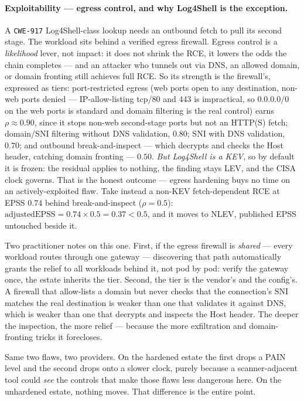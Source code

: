\documentclass[11pt]{article}
\newcommand{\code}[1]{\texttt{#1}}
\begin{document}
\paragraph{Exploitability --- egress control, and why Log4Shell is the exception.}
A \code{CWE-917} Log4Shell-class lookup needs an outbound fetch to pull its second
stage. The workload sits behind a verified egress firewall. Egress control is a
\emph{likelihood} lever, not impact: it does not shrink the RCE, it lowers the
odds the chain completes --- and an attacker who tunnels out via DNS, an allowed
domain, or domain fronting still achieves full RCE. So its strength is the
firewall's, expressed as tiers: port-restricted egress (web ports open to any
destination, non-web ports denied --- IP-allow-listing tcp/80 and 443 is
impractical, so $0.0.0.0/0$ on the web ports is standard and domain filtering is
the real control) earns $\rho\approx0.90$, since it stops non-web second-stage
ports but not an HTTP(S) fetch; domain/SNI filtering without DNS validation,
$0.80$; SNI with DNS validation, $0.70$; and outbound break-and-inspect --- which
decrypts and checks the Host header, catching domain fronting --- $0.50$. \emph{But Log4Shell is a KEV}, so by default it is
frozen: the residual applies to nothing, the finding stays LEV, and the CISA clock
governs. That is the honest outcome --- egress hardening buys no time on an
actively-exploited flaw. Take instead a non-KEV fetch-dependent RCE at EPSS
$0.74$ behind break-and-inspect ($\rho=0.5$):
$\mathrm{adjustedEPSS}=0.74\times0.5=0.37<0.5$, and it moves to NLEV, published
EPSS untouched beside it.

\begin{plain}
Two practitioner notes on this one. First, if the egress firewall is
\emph{shared} --- every workload routes through one gateway --- discovering that
path automatically grants the relief to all workloads behind it, not pod by pod:
verify the gateway once, the estate inherits the tier. Second, the tier is the
vendor's and the config's. A firewall that allow-lists a domain but never checks
that the connection's SNI matches the real destination is weaker than one that
validates it against DNS, which is weaker than one that decrypts and inspects the
Host header. The deeper the inspection, the more relief --- because the more
exfiltration and domain-fronting tricks it forecloses.
\end{plain}

\begin{plain}
Same two flaws, two providers. On the hardened estate the first drops a PAIN
level and the second drops onto a slower clock, purely because a scanner-adjacent
tool could \emph{see} the controls that make those flaws less dangerous here. On
the unhardened estate, nothing moves. That difference is the entire point.
\end{plain}
\end{document}
